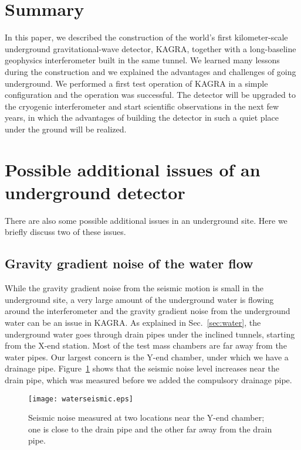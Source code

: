 \documentclass[prd ,twocolumn ,secnumarabic,dvips
,amssymb, amsmath,nobibnotes, aps, prd,superscriptaddress]{revtex4-1}
\begin{document}
{\section{Summary}\label{sec:6}
%
In this paper, we described the construction of the world's first kilometer-scale underground gravitational-wave detector, KAGRA, together with a long-baseline geophysics interferometer built in the same tunnel. We learned many lessons during the construction and we explained the advantages and challenges of going underground. We performed a first test operation of KAGRA in a simple configuration and the operation was successful. The detector will be upgraded to the cryogenic interferometer and start scientific observations in the next few years, in which the advantages of building the detector in such a quiet place under the ground will be realized.

\appendix*
\section{Possible additional issues of an underground detector}
There are also some possible additional issues in an underground site. Here we briefly discuss two of these issues.
\subsection{Gravity gradient noise of the water flow}
\label{sec:waterGGN}
%
While the gravity gradient noise from the seismic motion is small in the underground site, a very large amount of the underground water is flowing around the interferometer and the gravity gradient noise from the underground water can be an issue in KAGRA. As explained in Sec.~\ref{sec:water}, the underground water goes through drain pipes under the inclined tunnels, starting from the X-end station. Most of the test mass chambers are far away from the water pipes. Our largest concern is the Y-end chamber, under which we have a drainage pipe. Figure~\ref{fig:waterseismic} shows that the seismic noise level increases near the drain pipe, which was measured before we added the compulsory drainage pipe.
\begin{figure}[htbp]
	\begin{center}
		\texttt{[image: waterseismic.eps]}
		\caption{\label{fig:waterseismic}Seismic noise measured at two locations near the Y-end chamber; one is close to the drain pipe and the other far away from the drain pipe.}
	\end{center}
\end{figure}

}
\end{document}
